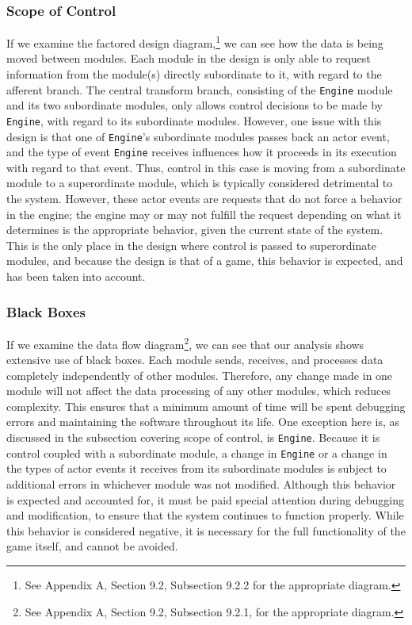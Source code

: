 \documentclass{article}
\begin{document}
		\subsubsection{Scope of Control}
			If we examine the factored design diagram,\footnote{See Appendix A, Section 9.2, Subsection 9.2.2 for the appropriate diagram.} we can see how the data is being moved between modules. Each module in the design is only able to request information from the module(s) directly subordinate to it, with regard to the afferent branch. The central transform branch, consisting of the \texttt{Engine} module and its two subordinate modules, only allows control decisions to be made by \texttt{Engine}, with regard to its subordinate modules. However, one issue with this design is that one of \texttt{Engine}'s subordinate modules passes back an actor event, and the type of event \texttt{Engine} receives influences how it proceeds in its execution with regard to that event. Thus, control in this case is moving from a subordinate module to a superordinate module, which is typically considered detrimental to the system. However, these actor events are requests that do not force a behavior in the engine; the engine may or may not fulfill the request depending on what it determines is the appropriate behavior, given the current state of the system. This is the only place in the design where control is passed to superordinate modules, and because the design is that of a game, this behavior is expected, and has been taken into account. 
		\subsubsection{Black Boxes}
			If we examine the data flow diagram\footnote{See Appendix A, Section 9.2, Subsection 9.2.1, for the appropriate diagram.}, we can see that our analysis shows extensive use of black boxes. Each module sends, receives, and processes data completely independently of other modules. Therefore, any change made in one module will not affect the data processing of any other modules, which reduces complexity. This ensures that a minimum amount of time will be spent debugging errors and maintaining the software throughout its life. One exception here is, as discussed in the subsection covering scope of control, is \texttt{Engine}. Because it is control coupled with a subordinate module, a change in \texttt{Engine} or a change in the types of actor events it receives from its subordinate modules is subject to additional errors in whichever module was not modified. Although this behavior is expected and accounted for, it must be paid special attention during debugging and modification, to ensure that the system continues to function properly. While this behavior is considered negative, it is necessary for the full functionality of the game itself, and cannot be avoided.  
\end{document}
